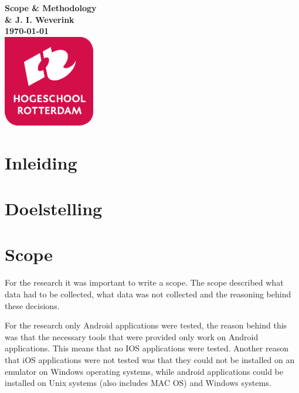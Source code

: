 \documentclass{article}
\begin{document}
\sffamily
\begin{titlepage}
  \centering
    \vfill
    {\bfseries\Huge
	Scope & Methodology \\
        \vskip2cm
      }
      {\bfseries\Large
        \& J. I. Weverink\\
      }
      {
        \bfseries\normalsize
        \vskip1cm
        \today\\
    }
    \vfill
    \includegraphics[width=4cm]{logohr.png} %
    \vfill
    \vfill
\end{titlepage}
\newpage
\tableofcontents

\clearpage %
\section{Inleiding}

\clearpage %
\section{Doelstelling}

\clearpage %

\section{Scope}

For the research it was important to write a scope. The scope described what data had to be collected, what data was not collected and the reasoning behind these decisions.

For the research only Android applications were tested, the reason behind this was that the necessary tools that were provided only work on Android applications. This means that no IOS applications were tested. Another reason that iOS applications were not tested was that they could not be installed on an emulator on Windows operating systems, while android applications could be installed on Unix systems (also includes MAC OS) and Windows systems.
\end{document}
